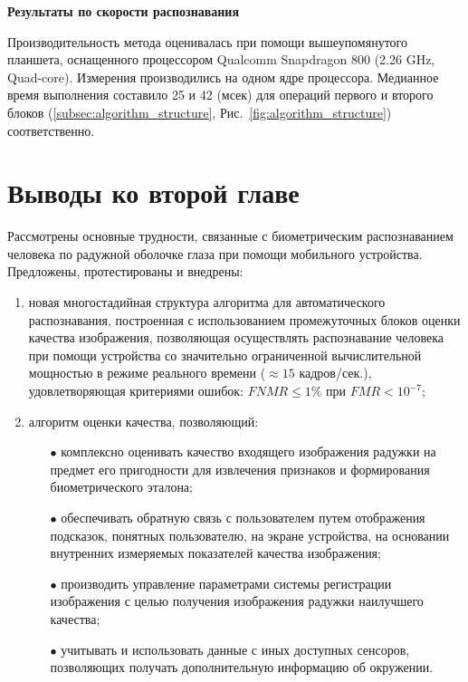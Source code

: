 {\bf Результаты по скорости распознавания}

Производительность метода оценивалась при помощи вышеупомянутого планшета, оснащенного процессором Qualcomm Snapdragon 800 (2.26 GHz, Quad-core). Измерения производились на одном ядре процессора. Медианное время выполнения составило 25 и 42 (мсек) для операций первого и второго блоков (\ref{subsec:algorithm_structure}, Рис.~\ref{fig:algorithm_structure}) соответственно.

\section{Выводы ко второй главе}

Рассмотрены основные трудности, связанные с биометрическим распознаванием человека по радужной оболочке глаза при помощи мобильного устройства. Предложены, протестированы и внедрены:

\begin{enumerate}
	\item новая многостадийная структура алгоритма для автоматического распознавания, построенная с использованием промежуточных блоков оценки качества изображения, позволяющая осуществлять распознавание человека при помощи устройства со значительно ограниченной вычислительной мощностью в режиме реального времени ($\approx15$ кадров/сек.), удовлетворяющая критериями ошибок: $FNMR\leq1\%$ при $FMR<10^{-7}$;
	\item алгоритм оценки качества, позволяющий:
	\begin{itemize}
		\item[$\bullet$] комплексно оценивать качество входящего изображения радужки на предмет его пригодности для извлечения признаков и формирования биометрического эталона;
		\item[$\bullet$] обеспечивать обратную связь с пользователем путем отображения подсказок, понятных пользователю, на экране устройства, на основании внутренних измеряемых показателей качества изображения;
		\item[$\bullet$] производить управление параметрами системы регистрации изображения с целью получения изображения радужки наилучшего качества;
		\item[$\bullet$] учитывать и использовать данные с иных доступных сенсоров, позволяющих получать дополнительную информацию об окружении.
	\end{itemize}
\end{enumerate}
